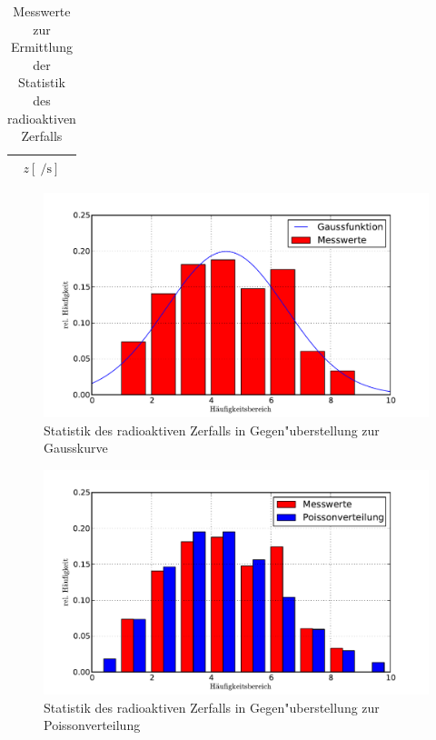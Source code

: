 		\begin{table}[h!]
			\begin{center}
				\caption{Messwerte zur Ermittlung der Statistik des radioaktiven Zerfalls \label{table:messung2}}
				\begin{tabular}{|c|c|c|c|c|c|c|c|c|c|}
					\hline
						\multicolumn{10}{|c|}{$z \left[\SI{}{\per \second}\right]$} \\
					\hline 
					\hline
						
					\hline 
				\end{tabular}
			\end{center}
		\end{table}

		\clearpage

		\begin{figure}[h!]
			\centering
			\includegraphics[width = 14cm]{img/verteilungGauss.pdf}
			\caption{Statistik des radioaktiven Zerfalls in Gegen"uberstellung zur Gausskurve \label{fig:verteilungGauss}}
		\end{figure}

		\begin{figure}[h!]
			\centering
			\includegraphics[width = 14cm]{img/verteilungPoisson.pdf}
			\caption{Statistik des radioaktiven Zerfalls in Gegen"uberstellung zur Poissonverteilung \label{fig:verteilungPoisson}}
		\end{figure}

	\clearpage